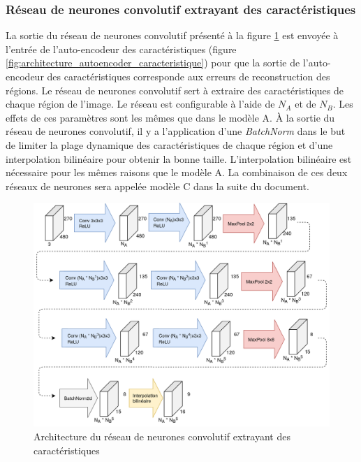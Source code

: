 \subsubsection{Réseau de neurones convolutif extrayant des caractéristiques}
    La sortie du réseau de neurones convolutif présenté à la figure \ref{fig:architecture_small_cnn} est envoyée à l'entrée de l'auto-encodeur des caractéristiques (figure \ref{fig:architecture_autoencoder_caracteristique}) pour que la sortie de l'auto-encodeur des caractéristiques corresponde aux erreurs de reconstruction des régions. Le réseau de neurones convolutif sert à extraire des caractéristiques de chaque région de l'image. Le réseau est configurable à l'aide de \(N_A\) et de \(N_B\). Les effets de ces paramètres sont les mêmes que dans le modèle A. À la sortie du réseau de neurones convolutif, il y a l'application d'une \textit{BatchNorm} dans le but de limiter la plage dynamique des caractéristiques de chaque région et d'une interpolation bilinéaire pour obtenir la bonne taille. L'interpolation bilinéaire est nécessaire pour les mêmes raisons que le modèle A. La combinaison de ces deux réseaux de neurones sera appelée modèle C dans la suite du document.
    \begin{figure}
        \centering
        \includegraphics[width=16.6cm]{images/Architecture_SmallCnnWithAutoencoder.png}
        \caption{Architecture du réseau de neurones convolutif extrayant des caractéristiques}
        \label{fig:architecture_small_cnn}
    \end{figure}

